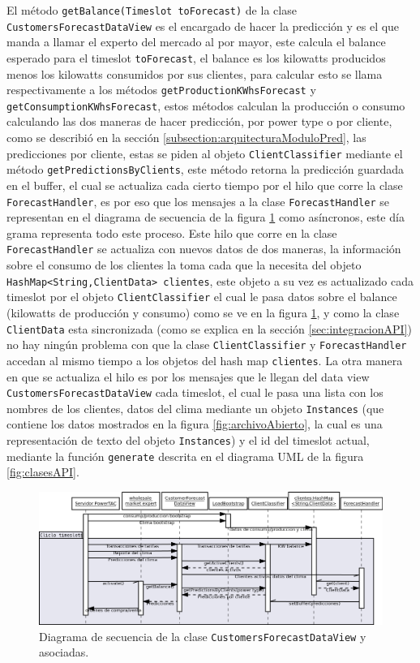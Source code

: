 El método \texttt{getBalance(Timeslot toForecast)} de la clase \texttt{CustomersForecastDataView} es el encargado de hacer la predicción y es el que manda a llamar el experto del mercado al por mayor, este calcula el balance esperado para el timeslot \texttt{toForecast}, el balance es los kilowatts producidos menos los kilowatts consumidos por sus clientes, para calcular esto se llama respectivamente a los métodos \texttt{getProductionKWhsForecast} y \texttt{getConsumptionKWhsForecast}, estos métodos calculan la producción o consumo calculando las dos maneras de hacer predicción, por power type o por cliente, como se describió en la sección \ref{subsection:arquitecturaModuloPred}, las predicciones por cliente, estas se piden al objeto \texttt{ClientClassifier} mediante el método \texttt{getPredictionsByClients}, este método retorna la predicción guardada en el buffer, el cual se actualiza cada cierto tiempo por el hilo que corre la clase \texttt{ForecastHandler}, es por eso que los mensajes a la clase \texttt{ForecastHandler} se representan en el diagrama de secuencia de la figura \ref{fig:diagramaDeSecuencia} como asíncronos, este día grama representa todo este proceso.
Este hilo que corre en la clase \texttt{ForecastHandler} se actualiza con nuevos datos de dos maneras, la información sobre el consumo de los clientes la toma cada que la necesita del objeto \texttt{HashMap<String,ClientData> clientes}, este objeto a su vez es actualizado cada timeslot por el objeto \texttt{ClientClassifier} el cual le pasa datos sobre el balance (kilowatts de producción y consumo) como se ve en la figura \ref{fig:diagramaDeSecuencia}, 
 y como la clase \texttt{ClientData} esta sincronizada (como se explica en la sección \ref{sec:integracionAPI}) no hay ningún problema con que la clase \texttt{ClientClassifier} y \texttt{ForecastHandler} accedan al mismo tiempo a los objetos del hash map \texttt{clientes}.
La otra manera en que se actualiza el hilo es por los mensajes que le llegan del data view \texttt{CustomersForecastDataView} cada timeslot, el cual le pasa una lista con los nombres de los clientes, datos del clima mediante un objeto \texttt{Instances} (que contiene los datos mostrados en la figura \ref{fig:archivoAbierto}, la cual es una representación de texto del objeto \texttt{Instances}) y el id del timeslot actual, mediante la función \texttt{generate} descrita en el diagrama UML de la figura \ref{fig:clasesAPI}.

\begin{figure}[h]
	\centering
	\includegraphics[width=17.5cm]{img/diagramaDeSecuencia.png}
	\caption{Diagrama de secuencia de la clase \texttt{CustomersForecastDataView} y asociadas.}
	\label{fig:diagramaDeSecuencia}
\end{figure}



